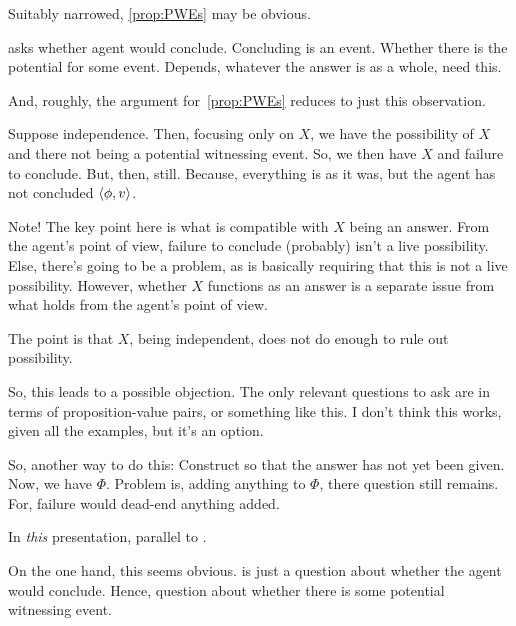 \begin{note}[Obvious?]
  Suitably narrowed, \autoref{prop:PWEs} may be obvious.

  \qzS{} asks whether agent would conclude.
  Concluding is an event.
  Whether there is the potential for some event.
  Depends, whatever the answer is as a whole, need this.

  And, roughly, the argument for~\autoref{prop:PWEs} reduces to just this observation.
\end{note}

\begin{note}
  \begin{argument}
    Suppose independence.
    Then, focusing only on \(X\), we have the possibility of \(X\) and there not being a potential witnessing event.
    So, we then have \(X\) and failure to conclude.
    But, then, \requ{} still.
    Because, everything is as it was, but the agent has not concluded \(\langle \phi, v \rangle\).

      {
        \color{red}
        Note!
        The key point here is what is compatible with \(X\) being an answer.
        From the agent's point of view, failure to conclude (probably) isn't a live possibility.
        Else, there's going to be a problem, as \qzS{} is basically requiring that this is not a live possibility.
        However, whether \(X\) functions as an answer is a separate issue from what holds from the agent's point of view.

        The point is that \(X\), being independent, does not do enough to rule out possibility.
      }
      {
        \color{blue}
        So, this leads to a possible objection.
        The only relevant questions to ask are in terms of proposition-value pairs, or something like this.
        I don't think this works, given all the examples, but it's an option.
      }
      {
        \color{green}
        So, another way to do this:
        Construct so that the answer has not yet been given.
        Now, we have \(\Phi\).
        Problem is, adding anything to \(\Phi\), there question still remains.
        For, failure would dead-end anything added.

        In \emph{this} presentation, parallel to \citeauthor{Carroll:1895uj}.
      }
    \end{argument}

  On the one hand, this seems obvious.
  \qzS{} is just a question about whether the agent would conclude.
  Hence, question about whether there is some potential witnessing event.


\end{note}
